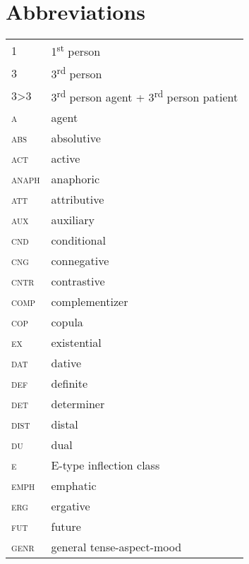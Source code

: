 ﻿\documentclass[output=paper]{langsci/langscibook}
\begin{document}
\section*{Abbreviations}
\begin{tabularx}{.45\textwidth}{ l Q }
1				&1\textsuperscript{st} person\\
3 				&3\textsuperscript{rd} person\\
3>3				&3\textsuperscript{rd} person agent + 3\textsuperscript{rd}
person patient\\
\textsc{a}	&agent\\
\textsc{abs}		&absolutive\\
\textsc{act}		&active\\
\textsc{anaph}		&anaphoric\\
\textsc{att}	&attributive\\
\textsc{aux}		&auxiliary\\
\textsc{cnd}		&conditional\\
\textsc{cng}		&connegative\\
\textsc{cntr}		&contrastive\\
\textsc{comp}       &complementizer\\
\textsc{cop}		&copula\\
\textsc{ex}		&existential\\
\textsc{dat} 	&dative\\
\textsc{def}		&definite\\
\textsc{det}	&determiner\\
\textsc{dist} 		&distal\\
\textsc{du}         &dual\\
\textsc{e}          &E-type inflection class\\
\textsc{emph}       &emphatic\\
\textsc{erg}        &ergative\\
\textsc{fut} 		&future\\
\textsc{genr}		&general tense-aspect-mood\\
\end{tabularx}
\end{document}
